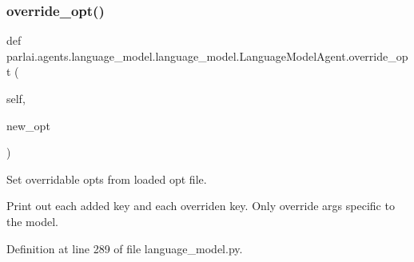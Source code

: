 \subsubsection{\texorpdfstring{override\+\_\+opt()}{override\_opt()}}
{\footnotesize\ttfamily def parlai.\+agents.\+language\+\_\+model.\+language\+\_\+model.\+Language\+Model\+Agent.\+override\+\_\+opt (\begin{DoxyParamCaption}\item[{}]{self,  }\item[{}]{new\+\_\+opt }\end{DoxyParamCaption})}

\begin{DoxyVerb}Set overridable opts from loaded opt file.

Print out each added key and each overriden key. Only override args specific to
the model.
\end{DoxyVerb}
 

Definition at line 289 of file language\+\_\+model.\+py.


